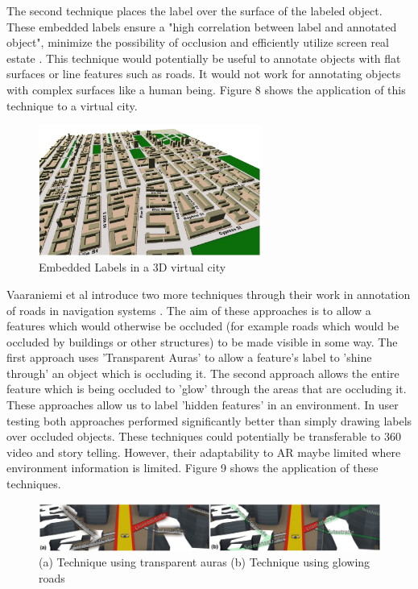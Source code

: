 \documentclass{article}
\begin{document}
The second technique places the label over the surface of the labeled object. These embedded labels ensure a "high correlation between label and annotated object", minimize the possibility of occlusion and efficiently utilize screen real estate \cite{Maass:2007:ELL:1294685.1294695}. This technique would potentially be useful to annotate objects with flat surfaces or line features such as roads. It would not work for annotating objects with complex surfaces like a human being. Figure 8 shows the application of this technique to a virtual city. 

\begin{figure}[htbp]
		\hspace{0.175\textwidth}
        \includegraphics[width=0.65\textwidth]{Images/embeddedLabels.jpg}
    	\caption{Embedded Labels  in a 3D virtual city \cite{Maass:2007:ELL:1294685.1294695}}
\end{figure}

Vaaraniemi et al introduce two more techniques through their work in annotation of roads in navigation systems \cite{Vaaraniemi2013}. The aim of these approaches is to allow a features which would otherwise be occluded (for example roads which would be occluded by buildings or other structures) to be made visible in some way. The first approach uses 'Transparent Auras' to allow a feature's label to 'shine through' an object which is occluding it. The second approach allows the entire feature which is being occluded to 'glow' through the areas that are occluding it. These approaches allow us to label 'hidden features' in an environment. In user testing both approaches performed significantly better than simply drawing labels over occluded objects. These techniques could potentially be transferable to 360 video and story telling. However, their adaptability to AR maybe limited where environment information is limited. Figure 9 shows the application of these techniques.  

\begin{figure}[htbp]
		
        \includegraphics[width=\textwidth]{Images/navigationv2.jpg}
    	\caption{(a) Technique using transparent auras (b) Technique using glowing roads \cite{Vaaraniemi2013}}
\end{figure}
\end{document}

